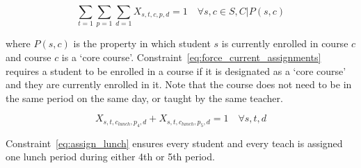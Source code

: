\documentclass[12pt]{article}
\begin{document}
\begin{equation} \label{eq:force_current_assignments}
	\displaystyle\sum_{t=1}\sum_{p=1}\sum_{d=1} X_{s,t,c,p,d} = 1 \quad \forall s,c \in S,C | P(s,c)
\end{equation}

where $P(s,c)$ is the property in which student $s$ is currently enrolled in course $c$ and course $c$ is a `core course'. Constraint~\ref{eq:force_current_assignments} requires a student to be enrolled in a course if it is designated as a `core course' and they are currently enrolled in it. Note that the course does not need to be in the same period on the same day, or taught by the same teacher.

\begin{equation} \label{eq:assign_lunch}
	 X_{s,t,c_{lunch},p_{4},d} +  X_{s,t,c_{lunch},p_{5},d} = 1 \quad \forall s,t,d
\end{equation}

Constraint~\ref{eq:assign_lunch} ensures every student and every teach is assigned one lunch period during either 4th or 5th period.
\end{document}
